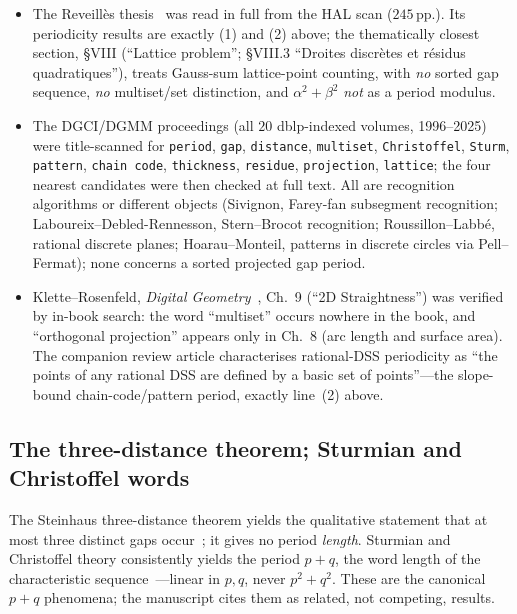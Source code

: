 \documentclass[11pt]{article}
\theoremstyle{plain}
\theoremstyle{remark}
\begin{document}
\begin{itemize}[leftmargin=1.8em,itemsep=2pt]
  \item The Reveill\`es thesis~\cite{Reveilles1991} was read in full from the HAL
        scan ($245$\,pp.). Its periodicity results are exactly (1) and (2) above; the
        thematically closest section, \S VIII (``Lattice problem''; \S VIII.3
        ``Droites discr\`etes et r\'esidus quadratiques''), treats Gauss-sum
        lattice-point counting, with \emph{no} sorted gap sequence, \emph{no}
        multiset/set distinction, and $\alpha^2+\beta^2$ \emph{not} as a period
        modulus.
  \item The DGCI/DGMM proceedings (all $20$ dblp-indexed volumes, 1996--2025) were
        title-scanned for \texttt{period}, \texttt{gap}, \texttt{distance},
        \texttt{multiset}, \texttt{Christoffel}, \texttt{Sturm}, \texttt{pattern},
        \texttt{chain code}, \texttt{thickness}, \texttt{residue},
        \texttt{projection}, \texttt{lattice}; the four nearest candidates were then
        checked at full text. All are recognition algorithms or different objects
        (Sivignon, Farey-fan subsegment recognition; Laboureix--Debled-Rennesson,
        Stern--Brocot recognition; Roussillon--Labb\'e, rational discrete planes;
        Hoarau--Monteil, patterns in discrete circles via Pell--Fermat); none
        concerns a sorted projected gap period.
  \item Klette--Rosenfeld, \emph{Digital Geometry}~\cite{KletteRosenfeld2004},
        Ch.~9 (``2D Straightness'') was verified by in-book search: the word
        ``multiset'' occurs nowhere in the book, and ``orthogonal projection''
        appears only in Ch.~8 (arc length and surface area). The companion review
        article characterises rational-DSS periodicity as ``the points of any
        rational DSS are defined by a basic set of points''---the slope-bound
        chain-code/pattern period, exactly line~(2) above.
\end{itemize}

\subsection{The three-distance theorem; Sturmian and Christoffel words}

The Steinhaus three-distance theorem yields the qualitative statement that at most
three distinct gaps occur~\cite{ThreeGap}; it gives no period \emph{length}.
Sturmian and Christoffel theory consistently yields the period $p+q$, the word
length of the characteristic sequence~\cite{BerstelEtAl2008}---linear in $p,q$,
never $p^2+q^2$. These are the canonical $p+q$ phenomena; the manuscript cites them
as related, not competing, results.
\end{document}
